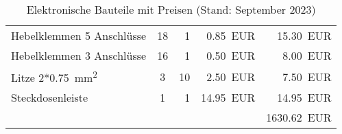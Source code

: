 \documentclass[./00PhotoBox.tex]{subfiles}
\begin{document}
\begin{table}[ht]
\begin{tabular}{l|c|r|r|r}
        Hebelklemmen 5 Anschlüsse              & 18     & 1              & \SI{0,85}{EUR}       & \SI{15,30}{EUR}   \\
        Hebelklemmen 3 Anschlüsse              & 16     & 1              & \SI{0,50}{EUR}       & \SI{8,00}{EUR}    \\
        Litze 2*\SI{0,75}{\square\milli\metre} & 3      & 10             & \SI{2,50}{EUR}       & \SI{7,50}{EUR}    \\
        Steckdosenleiste                       & 1      & 1              & \SI{14,95}{EUR}      & \SI{14,95}{EUR}   \\
                                               &        &                &                      & \SI{1630,62}{EUR} \\
    \end{tabular}
    \caption{Elektronische Bauteile mit Preisen (Stand: September 2023)}
    \label{tab:bauteile_elektronisch}
\end{table}
\end{document}

